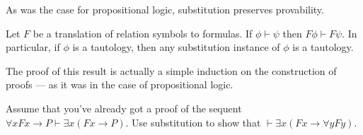  As was the case for propositional logic, substitution preserves
 provability.

\begin{subthm} Let $F$ be a translation of relation symbols to
  formulas.  If $\phi\vdash\psi$ then $F\phi\vdash F\psi$.  In
  particular, if $\phi$ is a tautology, then any substitution instance
  of $\phi$ is a tautology. \end{subthm}

The proof of this result is actually a simple induction on the
construction of proofs --- as it was in the case of propositional
logic.

\begin{exercise} Assume that you've already got a proof of the sequent
  $\forall xFx\to P\vdash \exists x(Fx\to P)$.  Use substitution to
  show that $\vdash \exists x(Fx\to \forall yFy)$. \end{exercise}

  



